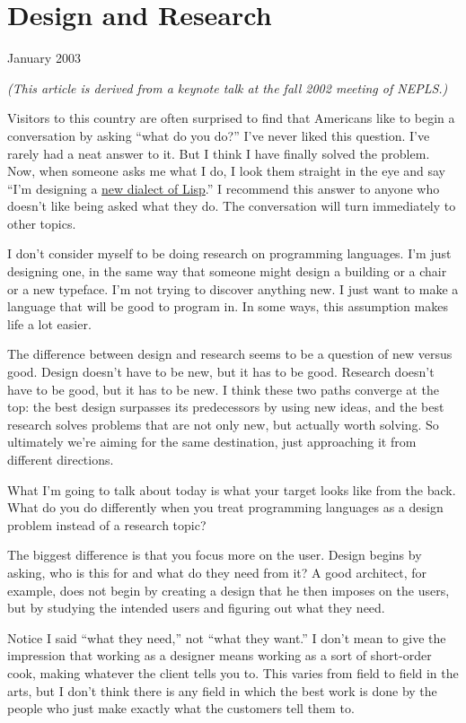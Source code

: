 \chapter{Design and Research}

January 2003

\emph{(This article is derived from a keynote talk at the fall 2002
meeting of NEPLS.)}

Visitors to this country are often surprised to find that Americans like
to begin a conversation by asking ``what do you do?'' I've never liked
this question. I've rarely had a neat answer to it. But I think I have
finally solved the problem. Now, when someone asks me what I do, I look
them straight in the eye and say ``I'm designing a \href{arc.html}{new
dialect of Lisp}.'' I recommend this answer to anyone who doesn't like
being asked what they do. The conversation will turn immediately to
other topics.

I don't consider myself to be doing research on programming languages.
I'm just designing one, in the same way that someone might design a
building or a chair or a new typeface. I'm not trying to discover
anything new. I just want to make a language that will be good to
program in. In some ways, this assumption makes life a lot easier.

The difference between design and research seems to be a question of new
versus good. Design doesn't have to be new, but it has to be good.
Research doesn't have to be good, but it has to be new. I think these
two paths converge at the top: the best design surpasses its
predecessors by using new ideas, and the best research solves problems
that are not only new, but actually worth solving. So ultimately we're
aiming for the same destination, just approaching it from different
directions.

What I'm going to talk about today is what your target looks like from
the back. What do you do differently when you treat programming
languages as a design problem instead of a research topic?

The biggest difference is that you focus more on the user. Design begins
by asking, who is this for and what do they need from it? A good
architect, for example, does not begin by creating a design that he then
imposes on the users, but by studying the intended users and figuring
out what they need.

Notice I said ``what they need,'' not ``what they want.'' I don't mean
to give the impression that working as a designer means working as a
sort of short-order cook, making whatever the client tells you to. This
varies from field to field in the arts, but I don't think there is any
field in which the best work is done by the people who just make exactly
what the customers tell them to.

